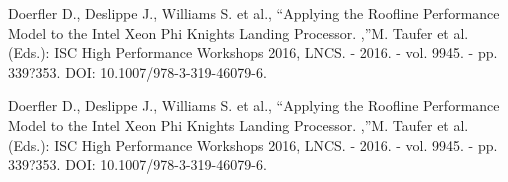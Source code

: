 \documentclass[
11pt,%
tightenlines,%
twoside,%
onecolumn,%
nofloats,%
nobibnotes,%
nofootinbib,%
superscriptaddress,%
noshowpacs,%
centertags]%
{revtex4}
\begin{document}
\begin{thebibliography}{99}
Doerfler D., Deslippe J., Williams S. et al., \textquotedblleft Applying the Roofline Performance Model to the Intel Xeon Phi Knights Landing Processor. ,\textquotedblright M. Taufer et al. (Eds.): ISC High Performance Workshops 2016, LNCS. - 2016. - vol. 9945. - pp. 339?353. DOI: 10.1007/978-3-319-46079-6.

Doerfler D., Deslippe J., Williams S. et al., \textquotedblleft Applying the Roofline Performance Model to the Intel Xeon Phi Knights Landing Processor. ,\textquotedblright M. Taufer et al. (Eds.): ISC High Performance Workshops 2016, LNCS. - 2016. - vol. 9945. - pp. 339?353. DOI: 10.1007/978-3-319-46079-6.

\end{thebibliography}
\end{document}
